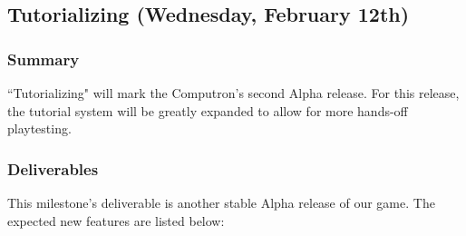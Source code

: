 \subsection{Tutorializing (Wednesday, February 12th)}

\subsubsection*{Summary}
``Tutorializing" will mark the Computron's second Alpha release. For this release, the tutorial 
system will be greatly expanded to allow for more hands-off playtesting.

\subsubsection*{Deliverables}
This milestone’s deliverable is another stable Alpha release of our game. The expected new 
features are listed below:

